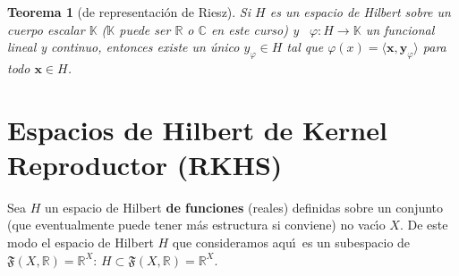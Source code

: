 \documentclass[12pt,reqno]{amsart}
\newtheorem*{myteo}{Teorema}
\newtheorem*{mydef}{Definici\'on}
\begin{document}





\begin{myteo}[de representaci\'on de Riesz]
Si $H$ es un espacio de Hilbert sobre un cuerpo escalar $\mathbb{K}$
($\mathbb{K}$ puede ser $\mathbb{R}$ o $\mathbb{C}$ en este curso)
y \ $\varphi: H \rightarrow \mathbb{K}$ un funcional lineal y continuo,
entonces existe un \'unico $y_{\varphi}\in H$ tal que
$\varphi(x)= \langle \mathbf{x},\mathbf{y}_{\varphi}\rangle$ para todo
$\mathbf{x}\in H$.
\end{myteo}



\section{Espacios de Hilbert de Kernel Reproductor (RKHS)}



Sea $H$ un espacio de Hilbert {\bf de funciones} (reales) definidas sobre
un conjunto (que eventualmente puede tener m\'as estructura si conviene)
no vac\'\i o $X$.
De este modo el espacio de Hilbert $H$ que consideramos aqu\'\i\
es un subespacio de $\mathfrak{F}(X,\mathbb{R})=\mathbb{R}^X$:
$H\subset\mathfrak{F}(X,\mathbb{R})=\mathbb{R}^X$.
\end{document}
